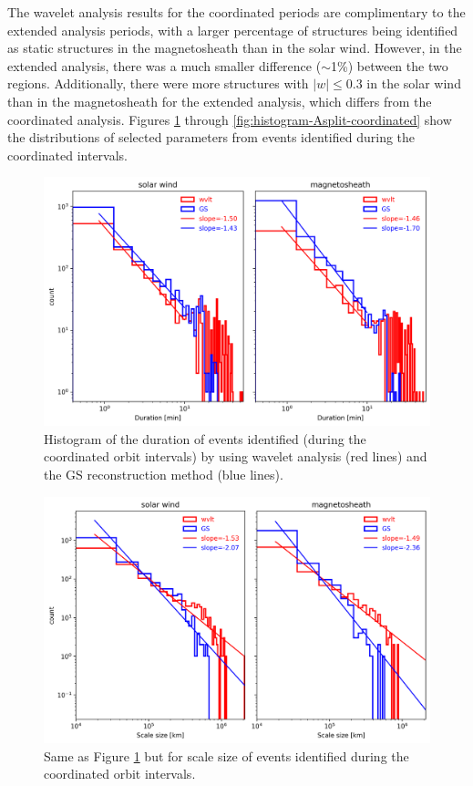 The wavelet analysis results for the coordinated periods are complimentary to the extended analysis periods, with a larger percentage of structures being identified as static structures in the magnetosheath than in the solar wind. However, in the extended analysis, there was a much smaller difference ($\sim$1\%) between the two regions. Additionally, there were more structures with $|w|\leq 0.3$ in the solar wind than in the magnetosheath for the extended analysis, which differs from the coordinated analysis. Figures \ref{fig:histogram-duration-coordinated} through \ref{fig:histogram-Asplit-coordinated} show the distributions of selected parameters from events identified during the coordinated intervals.

\begin{figure}
    \centering
    \includegraphics[width=\textwidth]{Figures/Histograms/duration_coordinated.png}
    \caption[Histogram of duration from coordinated analysis]{Histogram of the duration of events identified (during the coordinated orbit intervals) by using wavelet analysis (red lines) and the GS reconstruction method (blue lines).}
    \label{fig:histogram-duration-coordinated}
\end{figure}

\begin{figure}
    \centering
    \includegraphics[width=\textwidth]{Figures/Histograms/scalesize_coordinated.png}
    \caption[Histogram of scale size from coordinated analysis]{Same as Figure \ref{fig:histogram-duration-coordinated} but for scale size of events identified during the coordinated orbit intervals.}
    \label{fig:histogram-scalesize-coordinated}
\end{figure}

